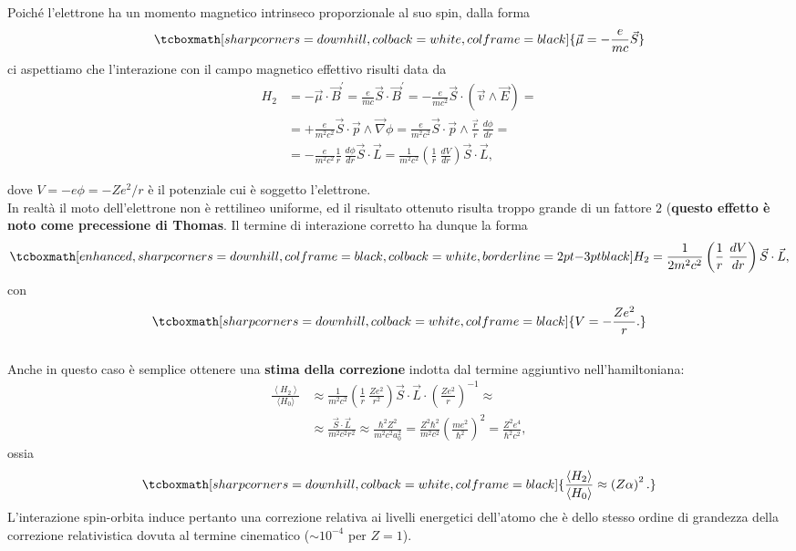 Poiché l'elettrone ha un momento magnetico intrinseco proporzionale al suo spin, dalla forma
	\begin{equation} 
		\tcboxmath[sharp corners=downhill, colback=white, colframe=black]{
			\vec{\mu}=-\frac{e}{mc}\vec{S}
			}
	\end{equation}
ci aspettiamo che l'interazione con il campo magnetico effettivo risulti data da
	\begin{align}
		H_2 & =  -\vec{\mu} \cdot \vec{B}^{'}=\frac{e}{mc} \vec{S} \cdot \vec{B}^{'}= -\frac{e}{mc^2}\vec{S} \cdot \left( \vec{v} \wedge \vec{E} \right)= \nonumber \\
		& =  + \frac{e}{m^2c^2}\vec{S} \cdot \vec{p} \wedge \vec{\nabla}\phi= \frac{e}{m^2c^2}\vec{S} \cdot \vec{p} \wedge \frac{\vec{r}}{r} \ \frac{d\phi}{dr}= \nonumber \\
		& =  -\frac{e}{m^2c^2}\frac{1}{r} \ \frac{d\phi}{dr}\vec{S} \cdot \vec{L}= \frac{1}{m^2c^2} \left( \frac{1}{r} \ \frac{dV}{dr} \right) \vec{S} \cdot \vec{L} ,
	\end{align}

dove $V=-e\phi=- Z e^2/r$ è il potenziale cui è soggetto l'elettrone. \\

In realtà il moto dell'elettrone non è rettilineo uniforme, ed il risultato ottenuto risulta troppo grande di un fattore $2$ (\textbf{questo effetto è noto come precessione di Thomas}. Il termine di interazione corretto ha dunque la forma
	\begin{equation}
	\label{eq:cap25_3}
		\tcboxmath[enhanced, sharp corners=downhill, colframe=black, colback=white, borderline={2pt}{-3pt}{black}]{
			H_2=\frac{1}{2m^2c^2} \left( \frac{1}{r} \ \frac{dV}{dr} \right) \vec{S} \cdot \vec{L} ,
			}
	\end{equation}
con
	\begin{equation} 
		\tcboxmath[sharp corners=downhill, colback=white, colframe=black]{
		V=-\frac{ Z e^2}{r} .
		}
	\end{equation}\\
	
Anche in questo caso è semplice ottenere una \textbf{stima della correzione} indotta dal termine aggiuntivo nell'hamiltoniana:
	\begin{align}
		\frac{\left< H_2 \right>}{\langle H_0 \rangle} & \approx   \frac{1}{m^2c^2} \left( \frac{1}{r} \ \frac{ Ze^2}{r^2} \right) \vec{S} \cdot \vec{L} \cdot \left( \frac{Ze^2}{r} \right)^{-1} \approx \nonumber  \\
		& \approx  \frac{\vec{S} \cdot \vec{L}}{m^2c^2r^2} \approx  \frac{\hbar^2 Z^2}{m^2c^2a_0^2}=  \frac{Z^2 \hbar^2}{m^2c^2}\left( \frac{me^2}{\hbar^2} \right)^2= \frac{Z^2e^4}{\hbar^2c^2} ,
	\end{align}
ossia
	\begin{equation} 
		\tcboxmath[sharp corners=downhill, colback=white, colframe=black]{
		\frac{\left< H_2 \right>}{\langle H_0 \rangle} \approx \left( Z\alpha \right)^2 .
		}
	\end{equation}
L'interazione spin-orbita induce pertanto una correzione relativa ai livelli energetici dell'atomo che è dello stesso ordine di grandezza della correzione relativistica dovuta al termine cinematico ($\sim10^{-4}$ per $ Z =1$).

